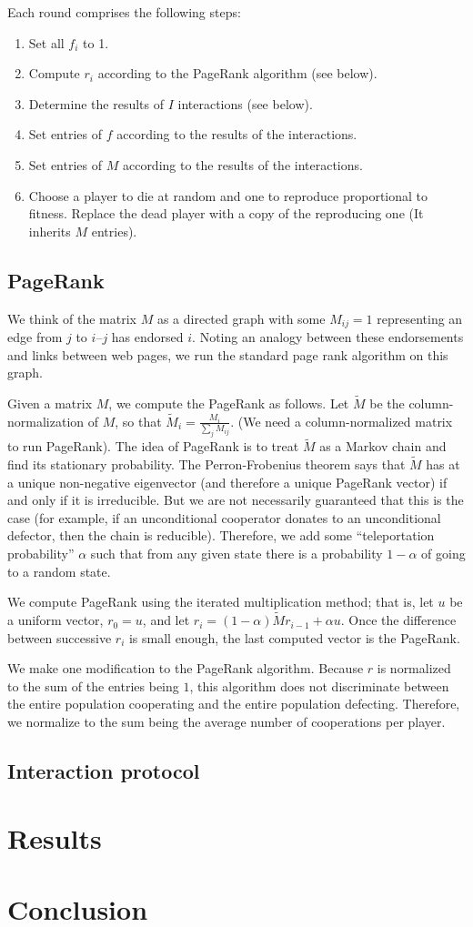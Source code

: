 \documentclass{amsart}
\begin{document}
Each round comprises the following steps:

\begin{enumerate}
\item Set all $f_i$ to 1.
\item Compute $r_i$ according to the PageRank algorithm (see below).
\item Determine the results of $I$ interactions (see below).
\item Set entries of $f$ according to the results of the interactions.
\item Set entries of $M$ according to the results of the interactions.
\item Choose a player to die at random and one to reproduce proportional to fitness. Replace the dead player with a copy of the reproducing one (It inherits $M$ entries).
\end{enumerate}

\subsection{PageRank}
\newcommand{\tM}{\tilde M}
We think of the matrix $M$ as a directed graph with some $M_{ij} = 1$ representing an edge from $j$ to $i$--$j$ has endorsed $i$. Noting an analogy between these endorsements and links between web pages, we run the standard page rank algorithm on this graph.

Given a matrix $M$, we compute the PageRank as follows. Let $\tM$ be the column-normalization of $M$, so that $\tM_i = \frac{M_i}{\sum_j M_{ij}}$. (We need a column-normalized matrix to run PageRank). The idea of PageRank is to treat $\tM$ as a Markov chain and find its stationary probability. The Perron-Frobenius theorem says that $\tM$ has at a unique non-negative eigenvector (and therefore a unique PageRank vector) if and only if it is irreducible. But we are not necessarily guaranteed that this is the case (for example, if an unconditional cooperator donates to an unconditional defector, then the chain is reducible). Therefore, we add some ``teleportation probability'' $\alpha$ such that from any given state there is a probability $1-\alpha$ of going to a random state.

We compute PageRank using the iterated multiplication method; that is, let $u$ be a uniform vector, $r_0 = u$, and let $r_i = (1-\alpha)\tilde M r_{i-1} + \alpha u$. Once the difference between successive $r_i$ is small enough, the last computed vector is the PageRank.

We make one modification to the PageRank algorithm. Because $r$ is normalized to the sum of the entries being $1$, this algorithm does not discriminate between the entire population cooperating and the entire population defecting. Therefore, we normalize to the sum being the average number of cooperations per player.

\subsection{Interaction protocol}

\section{Results}

\section{Conclusion}



\end{document}
